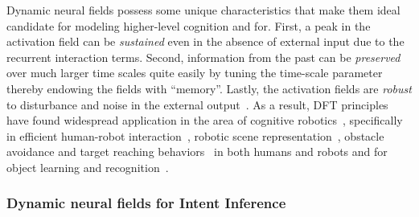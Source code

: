 Dynamic neural fields possess some unique characteristics that make them ideal candidate for modeling higher-level cognition and for. First, a peak in the activation field can be \textit{sustained} even in the absence of external input due to the recurrent interaction terms. Second, information from the past can be \textit{preserved} over much larger time scales quite easily by tuning the time-scale parameter thereby endowing the fields with ``memory''. Lastly, the activation fields are \textit{robust} to disturbance and noise in the external output~\cite{schoner2008dynamical}. 
As a result, DFT principles have found widespread application in the area of cognitive robotics~\cite{erlhagen2006dynamic}, specifically in efficient human-robot interaction~\cite{erlhagen2014dynamic}, robotic scene representation~\cite{zibner2011dynamic}, obstacle avoidance and target reaching behaviors~\cite{schoner1995dynamics} in both humans and robots and for object learning and recognition~\cite{faubel2008learning}. 


\subsubsection{Dynamic neural fields for Intent Inference}\label{sssec:dft_ii}

